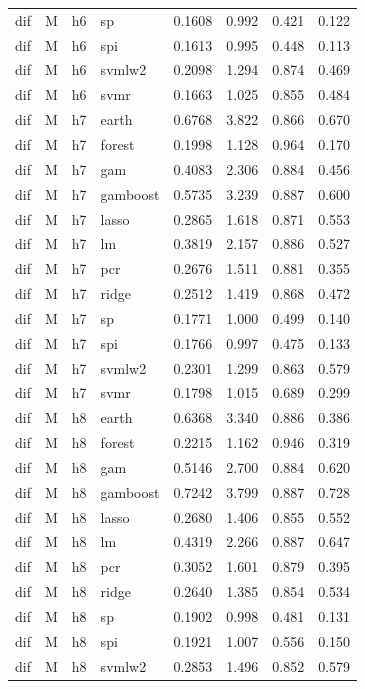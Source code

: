 \begin{ThreePartTable}
\begin{longtable}[t]{llclcccc}
dif & M & h6 & sp & 0.1608 & 0.992 & 0.421 & 0.122\\
dif & M & h6 & spi & 0.1613 & 0.995 & 0.448 & 0.113\\
dif & M & h6 & svmlw2 & 0.2098 & 1.294 & 0.874 & 0.469\\
dif & M & h6 & svmr & 0.1663 & 1.025 & 0.855 & 0.484\\
\addlinespace
dif & M & h7 & earth & 0.6768 & 3.822 & 0.866 & 0.670\\
dif & M & h7 & forest & 0.1998 & 1.128 & 0.964 & 0.170\\
dif & M & h7 & gam & 0.4083 & 2.306 & 0.884 & 0.456\\
dif & M & h7 & gamboost & 0.5735 & 3.239 & 0.887 & 0.600\\
dif & M & h7 & lasso & 0.2865 & 1.618 & 0.871 & 0.553\\
dif & M & h7 & lm & 0.3819 & 2.157 & 0.886 & 0.527\\
dif & M & h7 & pcr & 0.2676 & 1.511 & 0.881 & 0.355\\
dif & M & h7 & ridge & 0.2512 & 1.419 & 0.868 & 0.472\\
dif & M & h7 & sp & 0.1771 & 1.000 & 0.499 & 0.140\\
dif & M & h7 & spi & 0.1766 & 0.997 & 0.475 & 0.133\\
dif & M & h7 & svmlw2 & 0.2301 & 1.299 & 0.863 & 0.579\\
dif & M & h7 & svmr & 0.1798 & 1.015 & 0.689 & 0.299\\
\addlinespace
dif & M & h8 & earth & 0.6368 & 3.340 & 0.886 & 0.386\\
dif & M & h8 & forest & 0.2215 & 1.162 & 0.946 & 0.319\\
dif & M & h8 & gam & 0.5146 & 2.700 & 0.884 & 0.620\\
dif & M & h8 & gamboost & 0.7242 & 3.799 & 0.887 & 0.728\\
dif & M & h8 & lasso & 0.2680 & 1.406 & 0.855 & 0.552\\
dif & M & h8 & lm & 0.4319 & 2.266 & 0.887 & 0.647\\
dif & M & h8 & pcr & 0.3052 & 1.601 & 0.879 & 0.395\\
dif & M & h8 & ridge & 0.2640 & 1.385 & 0.854 & 0.534\\
dif & M & h8 & sp & 0.1902 & 0.998 & 0.481 & 0.131\\
dif & M & h8 & spi & 0.1921 & 1.007 & 0.556 & 0.150\\
dif & M & h8 & svmlw2 & 0.2853 & 1.496 & 0.852 & 0.579\\

\end{longtable}
\end{ThreePartTable}
